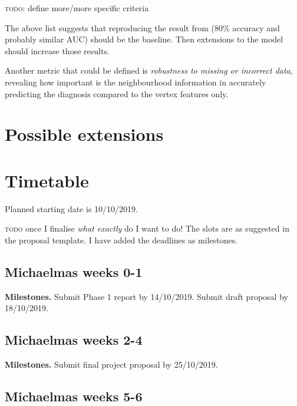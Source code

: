 \documentclass[12pt,a4paper,twoside]{article}
\begin{document}
\textsc{todo}: define more/more specific criteria

The above list suggests that reproducing the result from \cite{parisot2018disease} (80\% accuracy and probably similar AUC) should be the baseline. Then extensions to the model should increase those results.

Another metric that could be defined is \textit{robustness to missing or incorrect data}, revealing how important is the neighbourhood information in accurately predicting the diagnosis compared to the vertex features only.

\section*{Possible extensions}


\section*{Timetable}
\label{section:timetable}


Planned starting date is 10/10/2019.

\textsc{todo} once I finalise \textit{what exactly} do I want to do! The slots are as suggested in the proposal template. I have added the deadlines as milestones.

\subsection*{Michaelmas weeks 0-1}

\textbf{Milestones.} Submit Phase 1 report by 14/10/2019. Submit draft proposal by 18/10/2019.

\subsection*{Michaelmas weeks 2-4}

\textbf{Milestones.} Submit final project proposal by 25/10/2019.

\subsection*{Michaelmas weeks 5-6}
 
\end{document}
